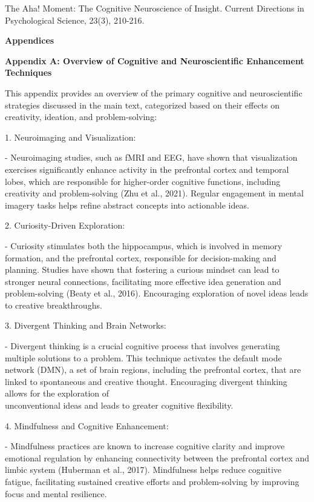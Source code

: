 \documentclass[
]{article}
\begin{document}
The Aha! Moment: The Cognitive Neuroscience of Insight. Current
Directions in Psychological Science, 23(3), 210-216.

\textbf{Appendices}

\textbf{Appendix A: Overview of Cognitive and Neuroscientific
Enhancement Techniques}

This appendix provides an overview of the primary cognitive and
neuroscientific strategies discussed in the main text, categorized based
on their effects on creativity, ideation, and problem-solving:

1. Neuroimaging and Visualization:

- Neuroimaging studies, such as fMRI and EEG, have shown that
visualization exercises significantly enhance activity in the prefrontal
cortex and temporal lobes, which are responsible for higher-order
cognitive functions, including creativity and problem-solving (Zhu et
al., 2021). Regular engagement in mental imagery tasks helps refine
abstract concepts into actionable ideas.

2. Curiosity-Driven Exploration:

- Curiosity stimulates both the hippocampus, which is involved in memory
formation, and the prefrontal cortex, responsible for decision-making
and planning. Studies have shown that fostering a curious mindset can
lead to stronger neural connections, facilitating more effective idea
generation and problem-solving (Beaty et al., 2016). Encouraging
exploration of novel ideas leads to creative breakthroughs.

3. Divergent Thinking and Brain Networks:

- Divergent thinking is a crucial cognitive process that involves
generating multiple solutions to a problem. This technique activates the
default mode network (DMN), a set of brain regions, including the
prefrontal cortex, that are linked to spontaneous and creative thought.
Encouraging divergent thinking allows for the exploration of\\
unconventional ideas and leads to greater cognitive flexibility.

4. Mindfulness and Cognitive Enhancement:

- Mindfulness practices are known to increase cognitive clarity and
improve emotional regulation by enhancing connectivity between the
prefrontal cortex and limbic system (Huberman et al., 2017). Mindfulness
helps reduce cognitive fatigue, facilitating sustained creative efforts
and problem-solving by improving focus and mental resilience.
\end{document}
